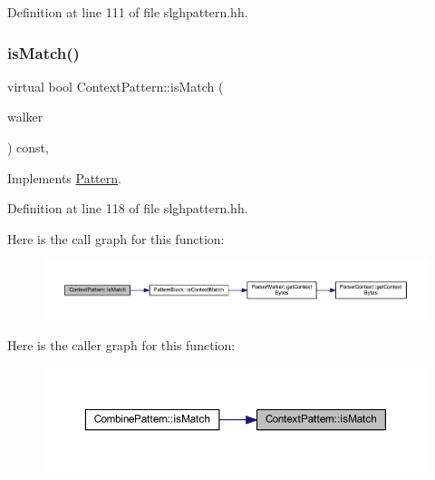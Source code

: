 Definition at line 111 of file slghpattern.\+hh.

\mbox{\label{class_context_pattern_ae9007dafab8003fbde577e75813000d1}} 
\subsubsection{\texorpdfstring{isMatch()}{isMatch()}}
{\footnotesize\ttfamily virtual bool Context\+Pattern\+::is\+Match (\begin{DoxyParamCaption}\item[{\mbox{\hyperlink{class_parser_walker}{Parser\+Walker}} \&}]{walker }\end{DoxyParamCaption}) const\hspace{0.3cm}{\ttfamily [inline]}, {\ttfamily [virtual]}}



Implements \mbox{\hyperlink{class_pattern_a2a85729a1c78a4905bd6ee1d11ea59d5}{Pattern}}.



Definition at line 118 of file slghpattern.\+hh.

Here is the call graph for this function\+:
\nopagebreak
\begin{figure}[H]
\begin{center}
\leavevmode
\includegraphics[width=350pt]{class_context_pattern_ae9007dafab8003fbde577e75813000d1_cgraph}
\end{center}
\end{figure}
Here is the caller graph for this function\+:
\nopagebreak
\begin{figure}[H]
\begin{center}
\leavevmode
\includegraphics[width=350pt]{class_context_pattern_ae9007dafab8003fbde577e75813000d1_icgraph}
\end{center}
\end{figure}
\mbox{\label{class_context_pattern_a0a49308ce8b3b8b66226f78911f5d0ec}} 
